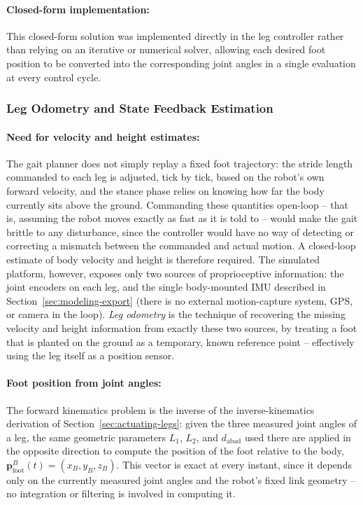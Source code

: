 \documentclass[12pt]{article}
\begin{document}
\paragraph{Closed-form implementation:} This closed-form solution was implemented directly in the leg controller rather than relying on an iterative or numerical solver, allowing each desired foot position to be converted into the corresponding joint angles in a single evaluation at every control cycle.

\subsubsection{Leg Odometry and State Feedback Estimation}
\label{subsec:leg-odometry}

\paragraph{Need for velocity and height estimates:} The gait planner does not simply replay a fixed foot trajectory: the stride length commanded to each leg is adjusted, tick by tick, based on the robot's own forward velocity, and the stance phase relies on knowing how far the body currently sits above the ground. Commanding these quantities open-loop -- that is, assuming the robot moves exactly as fast as it is told to -- would make the gait brittle to any disturbance, since the controller would have no way of detecting or correcting a mismatch between the commanded and actual motion. A closed-loop estimate of body velocity and height is therefore required. The simulated platform, however, exposes only two sources of proprioceptive information: the joint encoders on each leg, and the single body-mounted IMU described in Section~\ref{sec:modeling-export} (there is no external motion-capture system, GPS, or camera in the loop). \emph{Leg odometry} is the technique of recovering the missing velocity and height information from exactly these two sources, by treating a foot that is planted on the ground as a temporary, known reference point -- effectively using the leg itself as a position sensor.

\paragraph{Foot position from joint angles:} The forward kinematics problem is the inverse of the inverse-kinematics derivation of Section~\ref{sec:actuating-legs}: given the three measured joint angles of a leg, the same geometric parameters $L_1$, $L_2$, and $d_{\text{abad}}$ used there are applied in the opposite direction to compute the position of the foot relative to the body, $\mathbf{p}^{B}_{\text{foot}}(t) = (x_B, y_B, z_B)$. This vector is exact at every instant, since it depends only on the currently measured joint angles and the robot's fixed link geometry -- no integration or filtering is involved in computing it.
\end{document}
